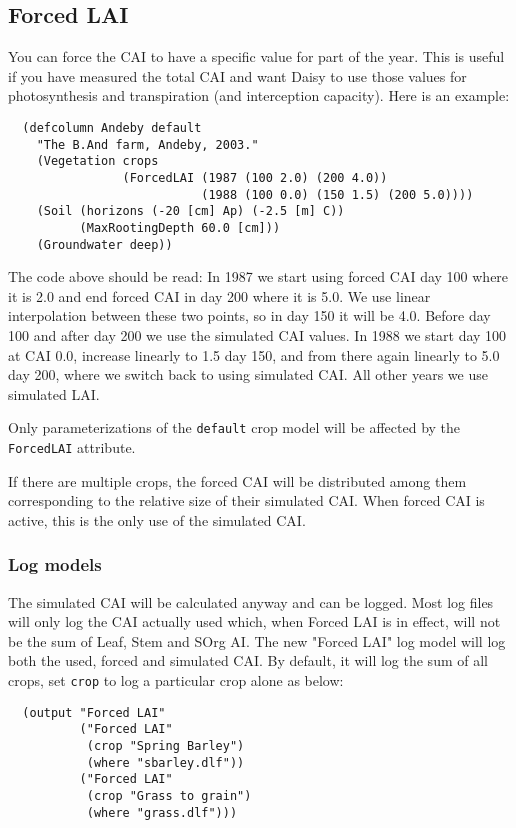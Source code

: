 \documentclass[a4paper]{article}
\begin{document}
\subsection{Forced LAI}
\label{sec:forced-lai}

You can force the CAI to have a specific value for part of the year.
This is useful if you have measured the total CAI and want Daisy to
use those values for photosynthesis and transpiration (and
interception capacity).  Here is an example:
\begin{verbatim}
  (defcolumn Andeby default
    "The B.And farm, Andeby, 2003."
    (Vegetation crops
                (ForcedLAI (1987 (100 2.0) (200 4.0))
                           (1988 (100 0.0) (150 1.5) (200 5.0))))
    (Soil (horizons (-20 [cm] Ap) (-2.5 [m] C))
          (MaxRootingDepth 60.0 [cm]))
    (Groundwater deep))
\end{verbatim}
The code above should be read: In 1987 we start using forced CAI day
100 where it is 2.0 and end forced CAI in day 200 where it is 5.0.  We
use linear interpolation between these two points, so in day 150 it
will be 4.0.  Before day 100 and after day 200 we use the simulated
CAI values.  In 1988 we start day 100 at CAI 0.0, increase linearly to
1.5 day 150, and from there again linearly to 5.0 day 200, where we
switch back to using simulated CAI\@.  All other years we use simulated
LAI.

Only parameterizations of the \texttt{default} crop model will be
affected by the \texttt{ForcedLAI} attribute.

If there are multiple crops, the forced CAI will be distributed among
them corresponding to the relative size of their simulated CAI\@.  When
forced CAI is active, this is the only use of the simulated CAI\@.  

\subsubsection{Log models}

The simulated CAI will be calculated anyway and can be logged.  Most
log files will only log the CAI actually used which, when Forced LAI
is in effect, will not be the sum of Leaf, Stem and SOrg AI\@.  The
new "Forced LAI" log model will log both the used, forced and
simulated CAI\@.  By default, it will log the sum of all crops, set
\texttt{crop} to log a particular crop alone as below:

\begin{verbatim}
  (output "Forced LAI"
          ("Forced LAI"
           (crop "Spring Barley")
           (where "sbarley.dlf"))
          ("Forced LAI"
           (crop "Grass to grain")
           (where "grass.dlf")))
\end{verbatim}
\end{document}
